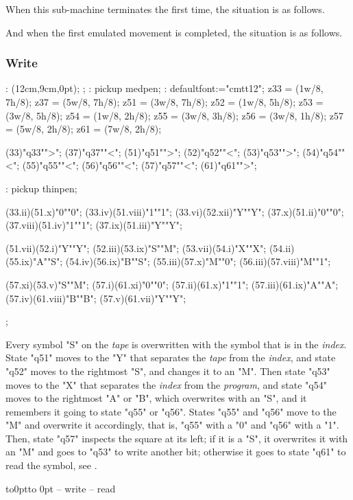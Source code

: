 When this sub-machine terminates the first time,
the situation is as follows.

\nextsituation

And when the first emulated movement is completed,
the situation is as follows.

\nextsituation

\vfill\break


\subsubsection{Write}

\MT:
\MTbeginfig(12cm,9cm,0pt);
\MTresetpa;
\MT: pickup medpen;
\MT: defaultfont:="cmtt12";
\MTcode
 z33 = (1w/8, 7h/8);
 z37 = (5w/8, 7h/8);
 z51 = (3w/8, 7h/8);
 z52 = (1w/8, 5h/8);
 z53 = (3w/8, 5h/8);
 z54 = (1w/8, 2h/8);
 z55 = (3w/8, 3h/8);
 z56 = (3w/8, 1h/8);
 z57 = (5w/8, 2h/8);
 z61 = (7w/8, 2h/8);

\MTstate(33)"q33"">";
\MTstate(37)"q37""<";
\MTstate(51)"q51"">";
\MTstate(52)"q52""<";
\MTstate(53)"q53"">";
\MTstate(54)"q54""<";
\MTstate(55)"q55""<";
\MTstate(56)"q56""<";
\MTstate(57)"q57""<";
\MTstate(61)"q61"">";

\MT: pickup thinpen;

\MTinput(33.ii)(51.x)"0""0";
\MTinput(33.iv)(51.viii)"1""1";
\MTinput(33.vi)(52.xii)"Y""Y";
\MTinput(37.x)(51.ii)"0""0";
\MTinput(37.viii)(51.iv)"1""1";
\MTinput(37.ix)(51.iii)"Y""Y";

\MTinput(51.vii)(52.i)"Y""Y";
\MTinput(52.iii)(53.ix)"S""M";
\MTinput(53.vii)(54.i)"X""X";
\MTinput(54.ii)(55.ix)"A""S";
\MTinput(54.iv)(56.ix)"B""S";
\MTinput(55.iii)(57.x)"M""0";
\MTinput(56.iii)(57.viii)"M""1";

\MTinput(57.xi)(53.v)"S""M";
\MTinput(57.i)(61.xi)"0""0";
\MTinput(57.ii)(61.x)"1""1";
\MTinput(57.iii)(61.ix)"A""A";
\MTinput(57.iv)(61.viii)"B""B";
\MTinput(57.v)(61.vii)"Y""Y";

\MTendfig;

Every symbol "S" on the {\em tape} is overwritten with
the symbol that is in the {\em index}.
State "q51" moves to the "Y" that separates the {\em tape}
from the {\em index}, and state "q52" moves to the rightmost "S",
and changes it to an "M". Then
state "q53" moves to the "X" that separates the {\em index}
from the {\em program}, and state "q54" moves to the rightmost
"A" or "B", which overwrites with an "S",
and it remembers it going to state "q55" or "q56".
States "q55" and "q56" move to the "M" and overwrite it
accordingly, that is, "q55" with a "0" and "q56" with a "1".
Then, state "q57" inspects the square at its left;
if it is a "S", it overwrites it with an "M" and goes to "q53"
to write another bit; otherwise it goes to state "q61"
to read the symbol, see .
\par\kern-12pt\vbox to0pt{\kern6pt\hbox to 0pt{\kern4cm\box\MTbox\hss}\vss}
-- write
-- read


